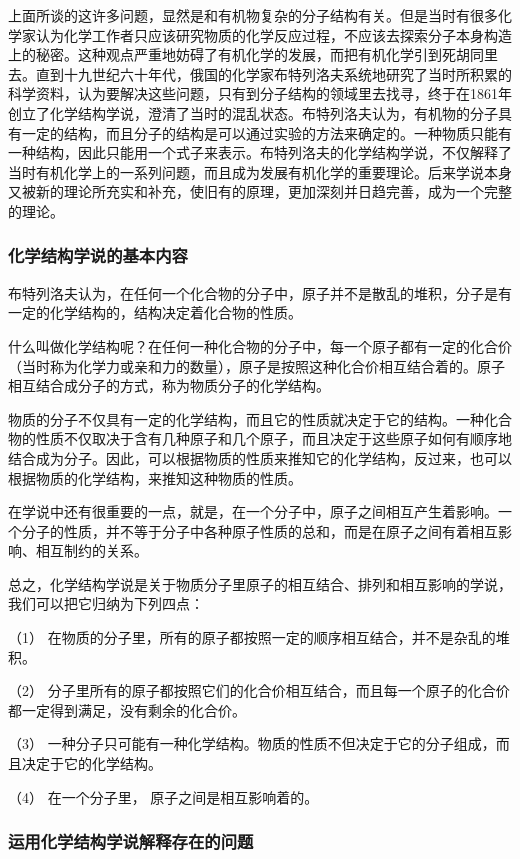 上面所谈的这许多问题，显然是和有机物复杂的分子结构有关。但是当时有很多化学家认为化学工作者只应该研究物质的化学反应过程，不应该去探索分子本身构造上的秘密。这种观点严重地妨碍了有机化学的发展，而把有机化学引到死胡同里去。直到十九世纪六十年代，俄国的化学家布特列洛夫系统地研究了当时所积累的科学资料，认为要解决这些问题，只有到分子结构的领域里去找寻，终于在1861年创立了化学结构学说，澄清了当时的混乱状态。布特列洛夫认为，有机物的分子具有一定的结构，而且分子的结构是可以通过实验的方法来确定的。一种物质只能有一种结构，因此只能用一个式子来表示。布特列洛夫的化学结构学说，不仅解释了当时有机化学上的一系列问题，而且成为发展有机化学的重要理论。后来学说本身又被新的理论所充实和补充，使旧有的原理，更加深刻并日趋完善，成为一个完整的理论。

\subsubsection{化学结构学说的基本内容}

布特列洛夫认为，在任何一个化合物的分子中，原子并不是散乱的堆积，分子是有一定的化学结构的，结构决定着化合物的性质。

什么叫做化学结构呢？在任何一种化合物的分子中，每一个原子都有一定的化合价（当时称为化学力或亲和力的数量），原子是按照这种化合价相互结合着的。原子相互结合成分子的方式，称为物质分子的化学结构。

物质的分子不仅具有一定的化学结构，而且它的性质就决定于它的结构。一种化合物的性质不仅取决于含有几种原子和几个原子，而且决定于这些原子如何有顺序地结合成为分子。因此，可以根据物质的性质来推知它的化学结构，反过来，也可以根据物质的化学结构，来推知这种物质的性质。

在学说中还有很重要的一点，就是，在一个分子中，原子之间相互产生着影响。一个分子的性质，并不等于分子中各种原子性质的总和，而是在原子之间有着相互影响、相互制约的关系。

总之，化学结构学说是关于物质分子里原子的相互结合、排列和相互影响的学说，我们可以把它归纳为下列四点：

（1）
在物质的分子里，所有的原子都按照一定的顺序相互结合，并不是杂乱的堆积。

（2）
分子里所有的原子都按照它们的化合价相互结合，而且每一个原子的化合价都一定得到满足，没有剩余的化合价。

（3）
一种分子只可能有一种化学结构。物质的性质不但决定于它的分子组成，而且决定于它的化学结构。

（4） 在一个分子里， 原子之间是相互影响着的。

\subsubsection{运用化学结构学说解释存在的问题}


